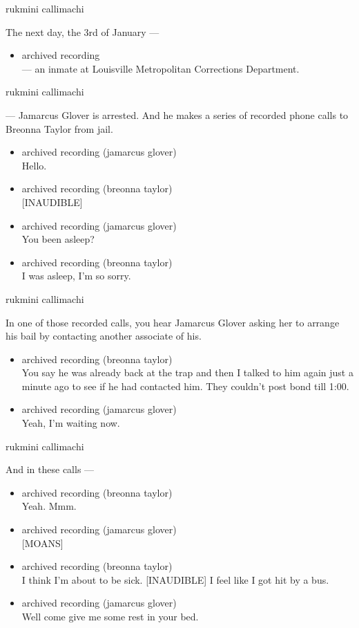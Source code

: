 rukmini callimachi

The next day, the 3rd of January ---

\begin{itemize}
\tightlist
\item
  archived recording\\
  --- an inmate at Louisville Metropolitan Corrections Department.
\end{itemize}

rukmini callimachi

--- Jamarcus Glover is arrested. And he makes a series of recorded phone
calls to Breonna Taylor from jail.

\begin{itemize}
\item
  archived recording (jamarcus glover)\\
  Hello.
\item
  archived recording (breonna taylor)\\
  {[}INAUDIBLE{]}
\item
  archived recording (jamarcus glover)\\
  You been asleep?
\item
  archived recording (breonna taylor)\\
  I was asleep, I'm so sorry.
\end{itemize}

rukmini callimachi

In one of those recorded calls, you hear Jamarcus Glover asking her to
arrange his bail by contacting another associate of his.

\begin{itemize}
\item
  archived recording (breonna taylor)\\
  You say he was already back at the trap and then I talked to him again
  just a minute ago to see if he had contacted him. They couldn't post
  bond till 1:00.
\item
  archived recording (jamarcus glover)\\
  Yeah, I'm waiting now.
\end{itemize}

rukmini callimachi

And in these calls ---

\begin{itemize}
\item
  archived recording (breonna taylor)\\
  Yeah. Mmm.
\item
  archived recording (jamarcus glover)\\
  {[}MOANS{]}
\item
  archived recording (breonna taylor)\\
  I think I'm about to be sick. {[}INAUDIBLE{]} I feel like I got hit by
  a bus.
\item
  archived recording (jamarcus glover)\\
  Well come give me some rest in your bed.
\end{itemize}

